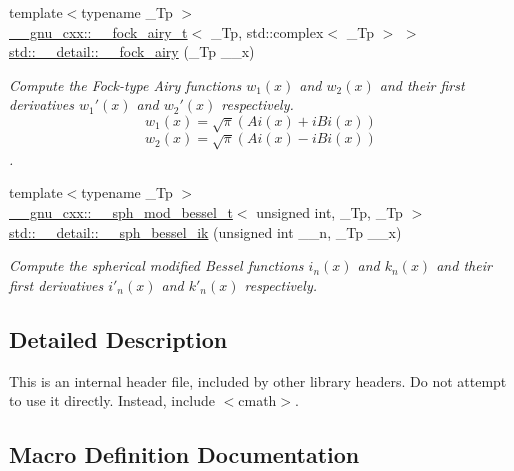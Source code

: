 \begin{DoxyCompactItemize}
{\footnotesize template$<$typename \+\_\+\+Tp $>$ }\\\hyperlink{struct____gnu__cxx_1_1____fock__airy__t}{\+\_\+\+\_\+gnu\+\_\+cxx\+::\+\_\+\+\_\+fock\+\_\+airy\+\_\+t}$<$ \+\_\+\+Tp, std\+::complex$<$ \+\_\+\+Tp $>$ $>$ \hyperlink{namespacestd_1_1____detail_a482936d128727bf73a5953639fd3a7e0}{std\+::\+\_\+\+\_\+detail\+::\+\_\+\+\_\+fock\+\_\+airy} (\+\_\+\+Tp \+\_\+\+\_\+x)
\begin{DoxyCompactList}\small\item\em Compute the Fock-\/type Airy functions $ w_1(x) $ and $ w_2(x) $ and their first derivatives $ w_1'(x) $ and $ w_2'(x) $ respectively. \[ w_1(x) = \sqrt{\pi}(Ai(x) + iBi(x)) \] \[ w_2(x) = \sqrt{\pi}(Ai(x) - iBi(x)) \]. \end{DoxyCompactList}\item 
{\footnotesize template$<$typename \+\_\+\+Tp $>$ }\\\hyperlink{struct____gnu__cxx_1_1____sph__mod__bessel__t}{\+\_\+\+\_\+gnu\+\_\+cxx\+::\+\_\+\+\_\+sph\+\_\+mod\+\_\+bessel\+\_\+t}$<$ unsigned int, \+\_\+\+Tp, \+\_\+\+Tp $>$ \hyperlink{namespacestd_1_1____detail_ad6abfd6ff1313354333c57e7b4c7b34c}{std\+::\+\_\+\+\_\+detail\+::\+\_\+\+\_\+sph\+\_\+bessel\+\_\+ik} (unsigned int \+\_\+\+\_\+n, \+\_\+\+Tp \+\_\+\+\_\+x)
\begin{DoxyCompactList}\small\item\em Compute the spherical modified Bessel functions $ i_n(x) $ and $ k_n(x) $ and their first derivatives $ i'_n(x) $ and $ k'_n(x) $ respectively. \end{DoxyCompactList}\end{DoxyCompactItemize}


\subsection{Detailed Description}
This is an internal header file, included by other library headers. Do not attempt to use it directly. Instead, include $<$cmath$>$. 

\subsection{Macro Definition Documentation}
\mbox{\label{sf__mod__bessel_8tcc_a746f247a80ce9ef275dfb1cffbabeabd}} 
